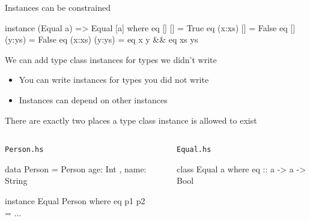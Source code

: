 \documentclass[usenames,dvipsnames,svgnames,table,aspectratio=169,mathserif]{beamer}
\newcommand{\nl}{\vspace{\baselineskip}}
\newcommand{\pnl}{\pause \nl}
\begin{document}
\begin{frame}[fragile]
Instances can be constrained

\nl

\begin{haskellcode}
instance (Equal a) => Equal [a] where
  eq []     []     = True
  eq (x:xs) []     = False
  eq []     (y:ys) = False
  eq (x:xs) (y:ys) = eq x y && eq xs ys
\end{haskellcode}

\pnl

We can add type class instances for types we didn't write
\end{frame}


\begin{frame}

\begin{itemize}
\item You can write instances for types you did not write
\item Instances can depend on other instances
\end{itemize}

\end{frame}


\begin{frame}[fragile]

There are exactly two places a type class instance is allowed to exist

\nl

\begin{columns}
\begin{column}[T]{0.49\textwidth}
\begin{block}{\tt Person.hs}
\begin{haskellcode}
data Person = Person
  { age: Int
  , name: String }

instance Equal Person where
  eq p1 p2 = ...
\end{haskellcode}
\end{block}
\end{column}
\begin{column}{0.02\textwidth}
\end{column}
\begin{column}[T]{0.49\textwidth}
\begin{block}{\tt Equal.hs}
\begin{haskellcode}
class Equal a where
  eq :: a -> a -> Bool
\end{haskellcode}
\end{block}
\end{column}
\end{columns}

\end{frame}
\end{document}
